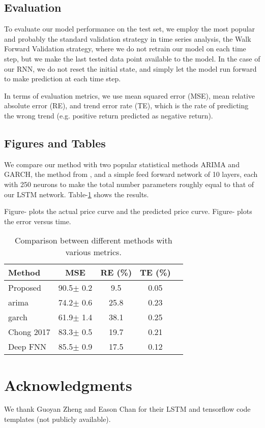 \documentclass{article}
\begin{document}
\subsection{Evaluation}
To evaluate our model performance on the test set, we employ the most popular and probably the standard validation strategy in time series analysis, the Walk Forward Validation strategy, where we do not retrain our model on each time step, but we make the last tested data point available to the model. In the case of our RNN, we do not reset the initial state, and simply let the model run forward to make prediction at each time step.

In terms of evaluation metrics, we use mean squared error (MSE), mean relative absolute error (RE), and trend error rate (TE), which is the rate of predicting the wrong trend (e.g. positive return predicted as negative return).

\subsection{Figures and Tables}
We compare our method with two popular statistical methods ARIMA and GARCH, the method from \cite{Chong2017}, and a simple feed forward network of 10 layers, each with 250 neurons to make the total number parameters roughly equal to that of our LSTM network. Table-\ref{comparison-table} shows the results.

Figure- plots the actual price curve and the predicted price curve. Figure- plots the error versus time.

\begin{table}[t]
\caption{Comparison between different methods with various metrics.}
\label{comparison-table}
\vskip 0.15in
\begin{center}
\begin{small}
\begin{sc}
\begin{tabular}{lcccr}
\hline
\abovespace\belowspace
Method & MSE & RE (\%) & TE (\%) \\
\hline
\abovespace
Proposed   & 90.5$\pm$ 0.2& 9.5& 0.05  \\
arima      & 74.2$\pm$ 0.6& 25.8& 0.23 \\
garch      & 61.9$\pm$ 1.4& 38.1& 0.25  \\
Chong 2017 & 83.3$\pm$ 0.5& 19.7& 0.21     \\
\belowspace
Deep FNN   & 85.5$\pm$ 0.9& 17.5& 0.12 \\
\hline
\end{tabular}
\end{sc}
\end{small}
\end{center}
\vskip -0.1in
\end{table}

\section*{Acknowledgments} 
We thank Guoyan Zheng and Eason Chan for their LSTM and tensorflow code templates (not publicly available).



\end{document}
